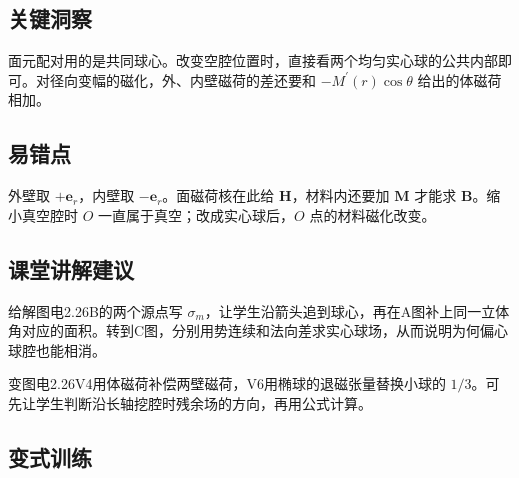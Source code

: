 \documentclass[UTF8,fontset=fandol,a4paper,11pt]{ctexart}
\newcommand{\vect}[1]{\bm{#1}}
\begin{document}
\subsection*{关键洞察}

面元配对用的是共同球心。改变空腔位置时，直接看两个均匀实心球的公共内部即可。对径向变幅的磁化，外、内壁磁荷的差还要和 $-M^{\prime}(r)\cos\theta$ 给出的体磁荷相加。



\subsection*{易错点}

外壁取 $+\vect e_r$，内壁取 $-\vect e_r$。面磁荷核在此给 $\vect H$，材料内还要加 $\vect M$ 才能求 $\vect B$。缩小真空腔时 $O$ 一直属于真空；改成实心球后，$O$ 点的材料磁化改变。



\subsection*{课堂讲解建议}

给解图电2.26B的两个源点写 $\sigma_m$，让学生沿箭头追到球心，再在A图补上同一立体角对应的面积。转到C图，分别用势连续和法向差求实心球场，从而说明为何偏心球腔也能相消。

变图电2.26V4用体磁荷补偿两壁磁荷，V6用椭球的退磁张量替换小球的 $1/3$。可先让学生判断沿长轴挖腔时残余场的方向，再用公式计算。


\subsection*{变式训练}
\end{document}
